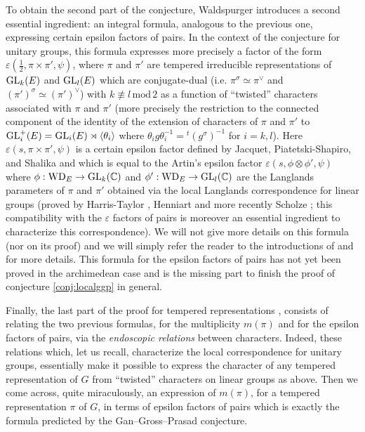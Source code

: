 To obtain the second part of the conjecture, Waldspurger introduces a second essential ingredient: an integral formula, analogous to the previous one, expressing certain epsilon factors of pairs.
In the context of the conjecture for unitary groups, this formula expresses more precisely a factor of the form $\varepsilon(\frac{1}{2}, \pi \times \pi', \psi)$, where $\pi$ and $\pi'$ are tempered irreducible representations of $\mathrm{GL}_k(E)$ and $\mathrm{GL}_l(E)$ which are conjugate-dual (i.e. $\pi^\sigma \simeq \pi^\vee$ and $(\pi')^\sigma \simeq (\pi')^\vee$) with $k\not\equiv l\,\mathrm{mod}\,2$ as a function of “twisted” characters associated with $\pi$ and $\pi'$ (more precisely the restriction to the connected component of the identity of the extension of characters of $\pi$ and $\pi'$ to $\mathrm{GL}_i^+(E) = \mathrm{GL}_i(E) \rtimes \langle \theta_i\rangle$ where $\theta_i g \theta_i^{-1} = {}^t(g^\sigma)^{-1}$ for $i = k, l$).
Here $\varepsilon(s, \pi \times \pi', \psi)$ is a certain epsilon factor defined by Jacquet, Piatetski-Shapiro, and Shalika \cite{jacquet1983rankin} and which is equal to the Artin's epsilon factor $\varepsilon(s, \phi \otimes \phi', \psi)$ where $\phi: \mathrm{WD}_E \to \mathrm{GL}_k(\mathbb{C})$ and $\phi': \mathrm{WD}_E \to \mathrm{GL}_l(\mathbb{C})$ are the Langlands parameters of $\pi$ and $\pi'$ obtained via the local Langlands correspondence for linear groups (proved by Harris-Taylor \cite{harris2001geometry}, Henniart \cite{henniart2000preuve} and more recently Scholze \cite{scholze2013local}; this compatibility with the $\varepsilon$ factors of pairs is moreover an essential ingredient to characterize this correspondence).
We will not give more details on this formula (nor on its proof) and we will simply refer the reader to the introductions of \cite{waldspurger2012calcul} and \cite{beuzart2014expression} for more details.
This formula for the epsilon factors of pairs has not yet been proved in the archimedean case and is the missing part to finish the proof of conjecture \ref{conj:localggp} in general.


Finally, the last part of the proof for tempered representations \cite{waldspurger2012conjecture}, \cite{beuzart2015endoscopie} consists of relating the two previous formulas, for the multiplicity $m(\pi)$ and for the epsilon factors of pairs, via the \emph{endoscopic relations} between characters.
Indeed, these relations which, let us recall, characterize the local correspondence for unitary groups, essentially make it possible to express the character of any tempered representation of $G$ from “twisted” characters on linear groups as above.
Then we come across, quite miraculously, an expression of $m(\pi)$, for a tempered representation $\pi$ of $G$, in terms of epsilon factors of pairs which is exactly the formula predicted by the Gan--Gross--Prasad conjecture.


